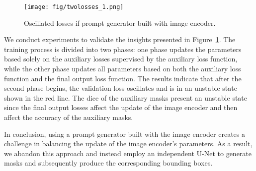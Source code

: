 \begin{figure}[!hbtp]
\centering
  \vspace{-0.2cm}
\texttt{[image: fig/twolosses\_1.png]}
      \caption{Oscillated losses if prompt generator built with image encoder.} 
\vspace{-0.2cm}
\label{fig:twolosses_1}
\end{figure}


We conduct experiments to validate the insights presented in Figure~\ref{fig:twolosses_1}. The training process is divided into two phases: one phase updates the parameters based solely on the auxiliary losses supervised by the auxiliary loss function, while the other phase updates all parameters based on both the auxiliary loss function and the final output loss function. The results indicate that after the second phase begins, the validation loss oscillates and is in an unstable state shown in the red line. The dice of the auxiliary masks present an unstable state since the final output losses affect the update of the image encoder and then affect the accuracy of the auxiliary masks. 

In conclusion, using a prompt generator built with the image encoder creates a challenge in balancing the update of the image encoder's parameters. As a result, we abandon this approach and instead employ an independent U-Net to generate masks and subsequently produce the corresponding bounding boxes. 


